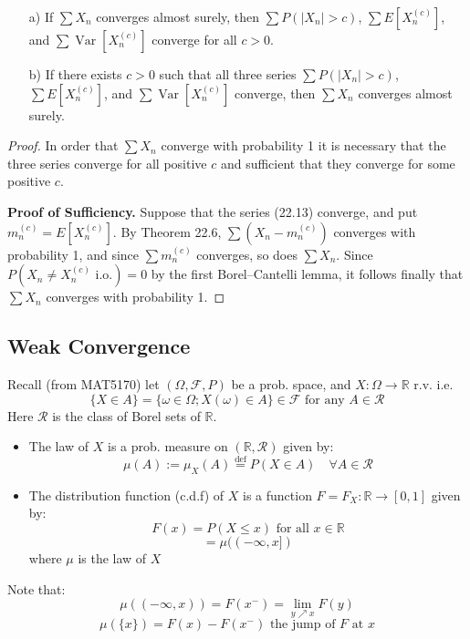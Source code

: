 \begin{enumerate}
    \item[a)] If $\sum X_n$ converges almost surely, then $\sum P(|X_n| > c)$, $\sum E[X_n^{(c)}]$, and $\sum \operatorname{Var}[X_n^{(c)}]$ converge for all $c > 0$.
    \item[b)] If there exists $c > 0$ such that all three series $\sum P(|X_n| > c)$, $\sum E[X_n^{(c)}]$, and $\sum \operatorname{Var}[X_n^{(c)}]$ converge, then $\sum X_n$ converges almost surely.
\end{enumerate}

\begin{proof}
    In order that $\sum X_n$ converge with probability 1 it is necessary that the three series converge for all positive $c$ and sufficient that they converge for some positive $c$.

\textbf{Proof of Sufficiency.}
Suppose that the series (22.13) converge, and put $m_n^{(c)} = E[X_n^{(c)}]$. By Theorem 22.6, $\sum(X_n - m_n^{(c)})$ converges with probability 1, and since $\sum m_n^{(c)}$ converges, so does $\sum X_n$. Since $P(X_n \neq X_n^{(c)} \text{ i.o.}) = 0$ by the first Borel--Cantelli lemma, it follows finally that $\sum X_n$ converges with probability 1.
\end{proof}
\subsection{Weak Convergence}
Recall (from MAT5170) let $(\Omega, \mathcal{F}, P)$ be a prob. space, and $X : \Omega \rightarrow \mathbb{R}$ r.v. i.e. 
\[\{X \in A\} = \{ \omega \in \Omega; X(\omega) \in A \} \in \mathcal{F} \text{ for any } A \in \mathcal{R}\]
Here $\mathcal{R}$ is the class of Borel sets of $\mathbb{R}$.

\begin{itemize}
  \item The law of $X$ is a prob. measure on $(\mathbb{R}, \mathcal{R})$ given by:
  \[\mu(A):= \mu_X(A) \stackrel{\text{def}}{=} P(X \in A) \quad \forall A \in \mathcal{R}\]

  \item The distribution function (c.d.f) of $X$ is a function $F=F_X : \mathbb{R} \rightarrow [0,1]$ given by:
  \[F(x) = P(X \leq x) \text{ for all } x \in \mathbb{R}\]
  \[= \mu((-\infty, x])\]
  where $\mu$ is the law of $X$
\end{itemize}

Note that:
\[\mu((-\infty, x)) = F(x^-) = \lim_{y \nearrow x} F(y)\]
\[\mu(\{x\}) = F(x) - F(x^-) \text{ the jump of } F \text{ at } x\]

